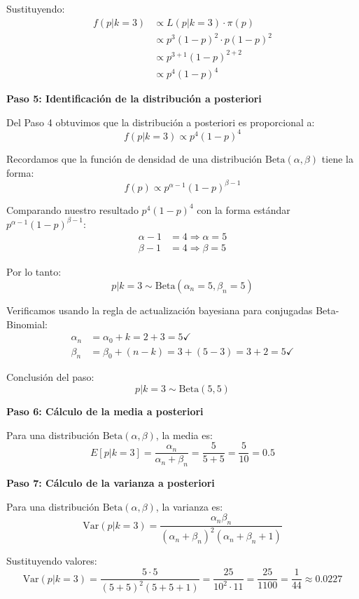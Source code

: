 \documentclass[11pt,a4paper]{article}
\begin{document}
Sustituyendo:
\begin{align*}
f(p|k = 3) &\propto L(p|k = 3) \cdot \pi(p) \\
&\propto p^3 (1-p)^2 \cdot p(1-p)^2 \\
&\propto p^{3+1} (1-p)^{2+2} \\
&\propto p^4 (1-p)^4
\end{align*}

\textbf{Paso 5: Identificación de la distribución a posteriori}

Del Paso 4 obtuvimos que la distribución a posteriori es proporcional a:
\[
f(p|k = 3) \propto p^4 (1-p)^4
\]

Recordamos que la función de densidad de una distribución $\text{Beta}(\alpha, \beta)$ tiene la forma:
\[
f(p) \propto p^{\alpha-1} (1-p)^{\beta-1}
\]

Comparando nuestro resultado $p^4 (1-p)^4$ con la forma estándar $p^{\alpha-1} (1-p)^{\beta-1}$:
\begin{align*}
\alpha - 1 &= 4 \Rightarrow \alpha = 5 \\
\beta - 1 &= 4 \Rightarrow \beta = 5
\end{align*}

Por lo tanto:
\[
p|k = 3 \sim \text{Beta}(\alpha_n = 5, \beta_n = 5)
\]

Verificamos usando la regla de actualización bayesiana para conjugadas Beta-Binomial:
\begin{align*}
\alpha_n &= \alpha_0 + k = 2 + 3 = 5 \checkmark \\
\beta_n &= \beta_0 + (n - k) = 3 + (5 - 3) = 3 + 2 = 5 \checkmark
\end{align*}

Conclusión del paso:
\[
\boxed{p|k = 3 \sim \text{Beta}(5, 5)}
\]

\textbf{Paso 6: Cálculo de la media a posteriori}

Para una distribución $\text{Beta}(\alpha, \beta)$, la media es:
\[
E[p|k = 3] = \frac{\alpha_n}{\alpha_n + \beta_n} = \frac{5}{5 + 5} = \frac{5}{10} = 0.5
\]

\textbf{Paso 7: Cálculo de la varianza a posteriori}

Para una distribución $\text{Beta}(\alpha, \beta)$, la varianza es:
\[
\text{Var}(p|k = 3) = \frac{\alpha_n \beta_n}{(\alpha_n + \beta_n)^2(\alpha_n + \beta_n + 1)}
\]

Sustituyendo valores:
\[
\text{Var}(p|k = 3) = \frac{5 \cdot 5}{(5 + 5)^2(5 + 5 + 1)} = \frac{25}{10^2 \cdot 11} = \frac{25}{1100} = \frac{1}{44} \approx 0.0227
\]
\end{document}
